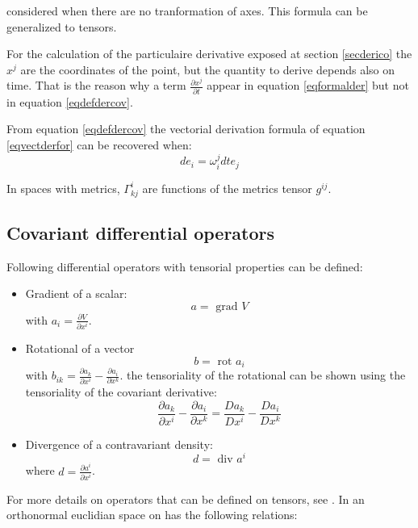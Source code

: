 \documentclass[12pt]{book}
\begin{document}
considered when there are no tranformation of axes.
This formula can be generalized to tensors.
\begin{rem}
For the calculation of the particulaire derivative exposed at section
\ref{secderico} the $x^j$ are the coordinates of the point, but the quantity
to derive depends also on time. That is the reason why a term $\frac{\partial
  x^j}{\partial t}$ appear in equation \ref{eqformalder} but not in equation
\ref{eqdefdercov}. 
\end{rem}
\begin{rem}
From equation \ref{eqdefdercov} the vectorial derivation formula of equation
\ref{eqvectderfor} can be recovered when: 
\begin{equation}
de_i=\omega_i^j dt e_j
\end{equation}
\end{rem}
\begin{rem}
In spaces with metrics, $\Gamma^i_{kj}$ are functions of the metrics
tensor $g^{ij}$.
\end{rem}
\subsection{Covariant differential operators}
Following differential operators with tensorial properties can be defined:
\begin{itemize}
\item Gradient of a scalar:
\begin{equation}
a=\mbox{ grad } V
\end{equation}
with $a_i=\frac{\partial V}{\partial x^i}$.
\item Rotational of a vector
\begin{equation}
b=\mbox{ rot } a_i
\end{equation}
with $b_{ik}=\frac{\partial a_k}{\partial x^i}-\frac{\partial
a_i}{\partial x^k}$. 
the tensoriality of the rotational can be shown using the tensoriality of the
covariant derivative:
\begin{equation}
\frac{\partial a_k}{\partial x^i}-\frac{\partial
a_i}{\partial x^k}=\frac{D a_k}{D x^i}-\frac{D
a_i}{D x^k}
\end{equation}
\item Divergence of a contravariant density:
\begin{equation}
d=\mbox{ div } a^i
\end{equation}
where $d=\frac{\partial a^i}{\partial x^i}$.
\end{itemize}
For more details on operators that can be defined on tensors, see
\cite{ma:tense:Brillouin64}. 
In an orthonormal euclidian space on has the following relations:
\end{document}
